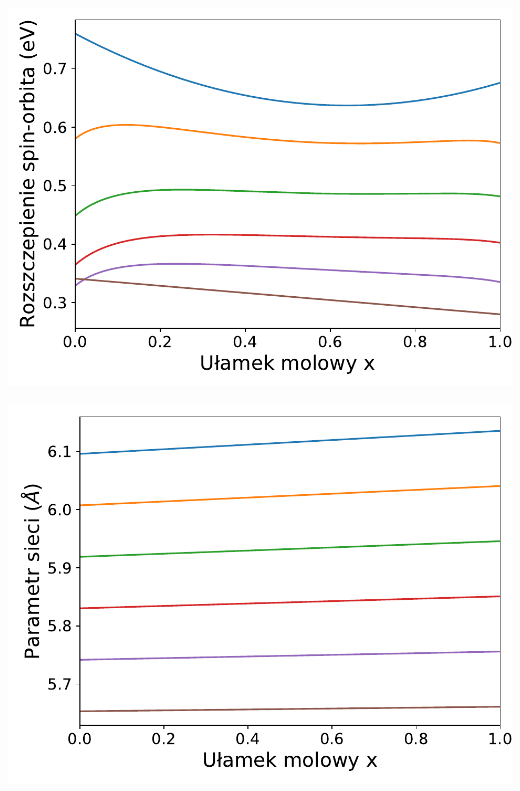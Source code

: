 \documentclass[12pt,openany,a4paper]{book}
\begin{document}
\begin{minipage}[t]{0.5\textwidth}
	\includegraphics[width = \linewidth]{Figures/quaternary/quat_delta_so_y.pdf}\label{fig:quat_delta_so_y}
\end{minipage}
\begin{minipage}[t]{0.5\textwidth}
	\includegraphics[width = \linewidth]{Figures/quaternary/quat_alc_y.pdf}\label{fig:quat_alc_y}
\end{minipage}
\end{document}

